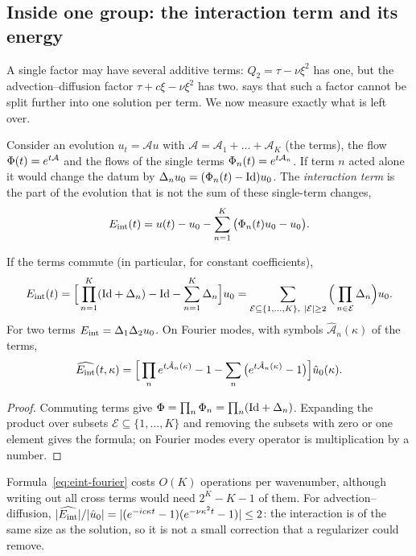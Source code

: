 \subsection{Inside one group: the interaction term and its energy}\label{sec:eint}
A single factor may have several additive terms: $Q_2=\tau-\nu\xi^2$ has one, but the advection--diffusion
factor $\tau+c\xi-\nu\xi^2$ has two.  says that such a factor cannot be split further
into one solution per term. We now measure exactly what is left over.

Consider an evolution $u_t=\mathcal Au$ with $\mathcal A=\mathcal A_1+\dots+\mathcal A_K$ (the terms), the flow $\Phi(t)=e^{t\mathcal A}$ and the
flows of the single terms $\Phi_n(t)=e^{t\mathcal A_n}$. If term $n$ acted alone it would change the datum by
$\Delta_nu_0=(\Phi_n(t)-\mathrm{Id})u_0$. The \emph{interaction term} is the part of the evolution that is not
the sum of these single-term changes,
\begin{equation}\label{eq:eint-def}
  E_{\mathrm{int}}(t)=u(t)-u_0-\sum_{n=1}^K\big(\Phi_n(t)u_0-u_0\big).
\end{equation}

\begin{theorem}\label{thm:eint}
If the terms commute (in particular, for constant coefficients),
\[
  E_{\mathrm{int}}(t)=\Big[\prod_{n=1}^K(\mathrm{Id}+\Delta_n)-\mathrm{Id}-\sum_{n=1}^K\Delta_n\Big]u_0
  =\sum_{\mathcal E\subseteq\{1,\dots,K\},\ \lvert\mathcal E\rvert\ge2}\Big(\prod_{n\in\mathcal E}\Delta_n\Big)u_0 .
\]
For two terms $E_{\mathrm{int}}=\Delta_1\Delta_2u_0$. On Fourier modes, with symbols $\hat{\mathcal A}_n(\kappa)$ of the terms,
\begin{equation}\label{eq:eint-fourier}
  \widehat{E_{\mathrm{int}}}(t,\kappa)=\Big[\prod_ne^{t\hat{\mathcal A}_n(\kappa)}-1-\sum_n\big(e^{t\hat{\mathcal A}_n(\kappa)}-1\big)\Big]\hat u_0(\kappa).
\end{equation}
\end{theorem}

\begin{proof}
Commuting terms give $\Phi=\prod_n\Phi_n=\prod_n(\mathrm{Id}+\Delta_n)$. Expanding the product over subsets
$\mathcal E\subseteq\{1,\dots,K\}$ and removing the subsets with zero or one element gives the formula; on
Fourier modes every operator is multiplication by a number.
\end{proof}

Formula~\eqref{eq:eint-fourier} costs $O(K)$ operations per wavenumber, although writing out all
cross terms would need $2^K-K-1$ of them. For advection--diffusion,
$\lvert\widehat{E_{\mathrm{int}}}\rvert/\lvert\hat u_0\rvert=\lvert(e^{-ic\kappa t}-1)(e^{-\nu\kappa^2t}-1)\rvert\le2$: the interaction
is of the same size as the solution, so it is not a small correction that a regularizer could remove.

